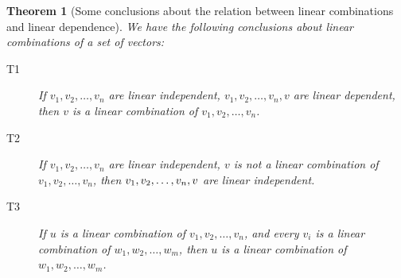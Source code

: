 \documentclass[onecolumn]{ctexart}
\newtheorem{theorem}{Theorem}
\begin{document}
\begin{theorem}[Some conclusions about the relation between linear combinations and linear dependence]
  We have the following conclusions about linear combinations of a set of vectors:
  \begin{description}
    \item[T1] If $v_1, v_2, \ldots, v_n$ are linear independent, $v_1, v_2, \ldots, v_n, v$ are linear dependent, then $v$ is a linear combination of $v_1, v_2, \ldots, v_n$.
    \item[T2] If $v_1, v_2, \ldots, v_n$ are linear independent, $v$ is not a linear combination of $v_1, v_2, \ldots, v_n$, then $v_1, v_2, \ldots, \\ v_n, v$ are linear independent.
    \item[T3] If $u$ is a linear combination of $v_1, v_2, \ldots, v_n$, and every $v_i$ is a linear combination of $w_1, w_2, \ldots, w_m$, then $u$ is a linear combination of $w_1, w_2, \ldots, w_m$.
  \end{description}
\end{theorem}
\end{document}
